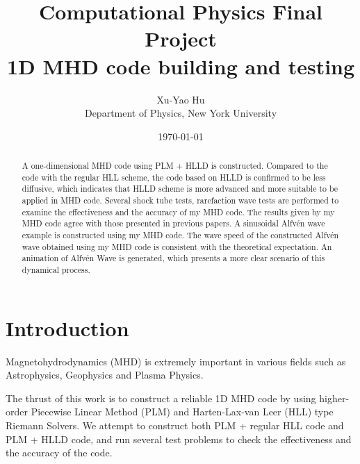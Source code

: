 \documentclass[10.5pt]{article}
\author{Xu-Yao Hu\\ Department of Physics, New York University}
\title{\bf{Computational Physics Final Project \\1D MHD code building and testing}}
\date{\today}
\begin{document}
\maketitle
\begin{abstract}
	A one-dimensional MHD code using PLM + HLLD is constructed. 
	Compared to the code with the
	regular HLL scheme, the code based on HLLD is confirmed to be less diffusive, which 
	indicates that HLLD scheme is more advanced and more suitable to be applied in 
	MHD code.
	Several shock tube tests, rarefaction wave tests are performed to examine the effectiveness 
	and the accuracy of my MHD code. The results given by 
	my MHD code agree with those presented in previous papers. A sinusoidal Alfv\'en wave 
	example is constructed using my MHD code. 
	The wave speed of the constructed Alfv\'en wave 
	obtained using my MHD code is consistent with the theoretical expectation.
	An animation of Alfv\'en Wave is generated, which presents a
	more clear scenario of this dynamical process.
\end{abstract}

\section{Introduction}
Magnetohydrodynamics (MHD) is extremely important in various fields such as Astrophysics, Geophysics and Plasma Physics.

The thrust of this work is to construct a reliable 1D MHD code by using higher-order Piecewise 
Linear Method (PLM) and Harten-Lax-van Leer (HLL) type Riemann Solvers. 
We attempt to construct both PLM + regular HLL code and PLM + HLLD code, and 
run several test problems to check the effectiveness and the accuracy of the code.
\end{document}
